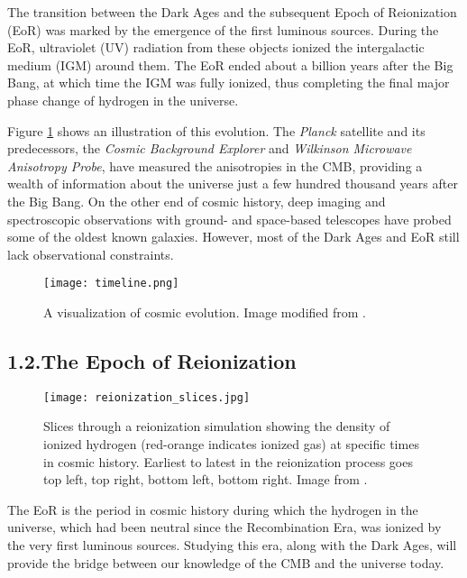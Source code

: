 \documentclass[12pt]{article}
\begin{document}
The transition between the Dark Ages and the subsequent Epoch of Reionization (EoR) was marked by the emergence of the first luminous sources. During the EoR, ultraviolet (UV) radiation from these objects ionized the intergalactic medium (IGM) around them. The EoR ended about a billion years after the Big Bang, at which time the IGM was fully ionized, thus completing the final major phase change of hydrogen in the universe.

Figure \ref{fig:timeline} shows an illustration of this evolution. The \textit{Planck} satellite and its predecessors, the \textit{Cosmic Background Explorer} and \textit{Wilkinson Microwave Anisotropy Probe}, have measured the anisotropies in the CMB, providing a wealth of information about the universe just a few hundred thousand years after the Big Bang. On the other end of cosmic history, deep imaging and spectroscopic observations with ground- and space-based telescopes have probed some of the oldest known galaxies. However, most of the Dark Ages and EoR still lack observational constraints. \vspace{3mm}

\begin{figure}[tb]
	\centering
	\texttt{[image: timeline.png]}
	\caption[History of the universe]{A visualization of cosmic evolution. Image modified from \cite{loeb2006}.}
	\label{fig:timeline}
\end{figure}

\tocless\subsection{\hypertarget{subsec:eor}{1.2.\hspace{0.75em}The Epoch of Reionization}}

\begin{figure}[t]
	\centering
	\texttt{[image: reionization\_slices.jpg]}
	\caption[Redshift slices through a simulation showing the evolution of ionized hydrogen]{Slices through a reionization simulation showing the density of ionized hydrogen (red-orange indicates ionized gas) at specific times in cosmic history. Earliest to latest in the reionization process goes top left, top right, bottom left, bottom right. Image from \cite{trac2007}.}
	\label{fig:reionization}
\end{figure}

The EoR is the period in cosmic history during which the hydrogen in the universe, which had been neutral since the Recombination Era, was ionized by the very first luminous sources. Studying this era, along with the Dark Ages, will provide the bridge between our knowledge of the CMB and the universe today.
\end{document}
